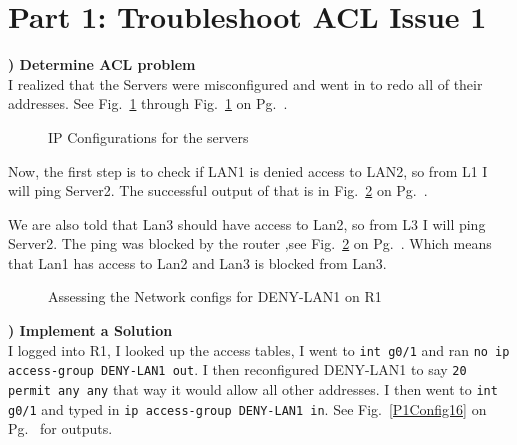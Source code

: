 \documentclass{report}
\title{\classinfo}
\author{\semester}
\date{\today}
\newcommand{\mysection}[1]{\section*{#1}}
\newcommand{\mysubsection}[2]{\textbf{\romannumeral #1) #2}}
\begin{document}
\maketitle

\mysection{\textbf{Part 1: Troubleshoot ACL Issue 1}}

\mysubsection{1}{Determine ACL problem}\\
I realized that the Servers were misconfigured and went in to 
redo all of their addresses.
See Fig.~\ref{P1Server16} through
Fig.~\ref{P1Server16} on
Pg.~\pageref{P1Server16}.


\begin{figure}[!hbt]\centering
{}\hfill
{}\par 
{}
\caption{IP Configurations for the servers}\label{P1Server16}
\end{figure}


Now, the first step is to check if LAN1 is denied access to LAN2,
so from L1 I will ping Server2. The successful output of that is in
Fig.~\ref{P1Net16} on Pg.~\pageref{P1Net16}. 


We are also told that Lan3 should have access to Lan2, so 
from L3 I will ping Server2. The ping was blocked by the router
,see Fig.~\ref{P1Net16} on Pg.~\pageref{P1Net16}.
Which means that Lan1 has access to Lan2 and Lan3 is blocked from Lan3. 


\begin{figure}[!hbt]\centering
{}\hfill
{}\par 
\caption{Assessing the Network configs for DENY-LAN1 on R1}\label{P1Net16}
\end{figure}


\noindent\mysubsection{2}{Implement a Solution}\\
I logged into R1, I looked up the access tables, I went to
{\scriptsize{\verb$int g0/1$}\normalsize} and ran
{\scriptsize{\verb$no ip access-group DENY-LAN1 out$}\normalsize}. I then
reconfigured DENY-LAN1 to say 
{\scriptsize{\verb$20 permit any any$}\normalsize} that way it would 
allow all other addresses.  I then went to 
{\scriptsize{\verb$int g0/1$}\normalsize} and typed
in {\scriptsize{\verb$ip access-group DENY-LAN1 in$}\normalsize}. See
Fig.~\ref{P1Config16} on Pg.~\pageref{P1Config16} for outputs.
\end{document}
